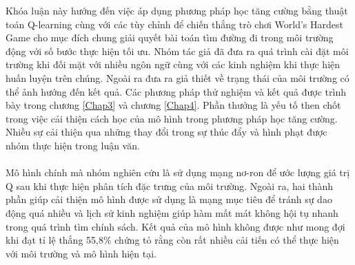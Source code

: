 Khóa luận này hướng đến việc áp dụng phương pháp học tăng cường bằng thuật toán Q-learning cùng với các tùy chỉnh để chiến thắng trò chơi World's Hardest Game cho mục đích chung giải quyết bài toán tìm đường đi trong môi trường động với số bước thực hiện tối ưu. Nhóm tác giả đã đưa ra quá trình cài đặt môi trường khi đối mặt với nhiều ngôn ngữ cùng với các kinh nghiệm khi thực hiện huấn luyện trên chúng. Ngoài ra đưa ra giả thiết về trạng thái của môi trường có thể ảnh hướng đến kết quả. Các phương pháp thử nghiệm và kết quả được trình bày trong chương \ref{Chap3} và chương \ref{Chap4}. Phần thưởng là yếu tố then chốt trong việc cải thiện cách học của mô hình trong phương pháp học tăng cường. Nhiều sự cải thiện qua những thay đổi trong sự thúc đẩy và hình phạt được nhóm thực hiện trong luận văn. \\
\\
Mô hình chính mà nhóm nghiên cứu là sử dụng mạng nơ-ron để ước lượng giá trị Q sau khi thực hiện phân tích đặc trưng của môi trường. Ngoài ra, hai thành phần giúp cải thiện mô hình được sử dụng là mạng mục tiêu để tránh sự dao động quá nhiều và lịch sử kinh nghiệm giúp hàm mất mát không hội tụ nhanh trong quá trình tìm chính sách. Kết quả của mô hình không được như mong đợi khi đạt tỉ lệ thắng 55,8\% chứng tỏ rằng còn rất nhiều cải tiến có thể thực hiện với môi trường và mô hình hiện tại.    